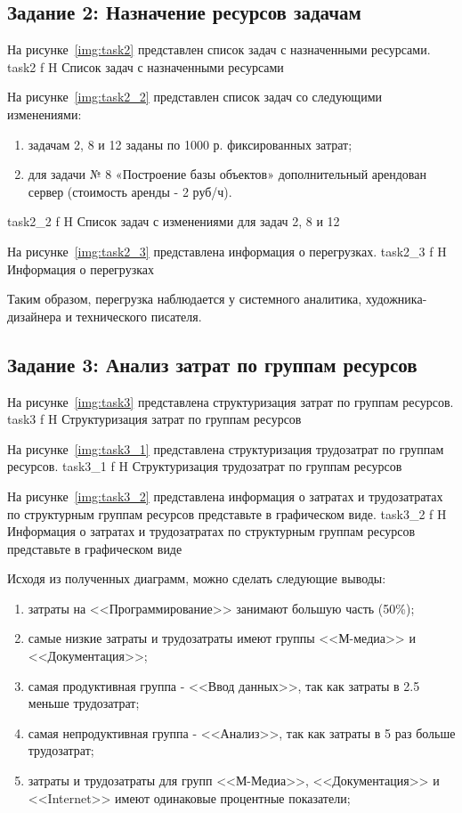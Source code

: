 \subsection{Задание 2: Назначение ресурсов задачам}

На рисунке~\ref{img:task2} представлен список задач с назначенными ресурсами.
	{task2}
	{f}
	{H}
	{\textwidth}
	{Список задач с назначенными ресурсами}

\clearpage
На рисунке~\ref{img:task2_2} представлен список задач со следующими изменениями:
\begin{enumerate}
	\item задачам 2, 8 и 12 заданы по 1000 р. фиксированных затрат;
	\item для задачи № 8 «Построение базы объектов» дополнительный арендован сервер (стоимость аренды - 2 руб/ч).
\end{enumerate}
	{task2_2}
	{f}
	{H}
	{\textwidth}
	{Список задач с изменениями для задач 2, 8 и 12}


На рисунке~\ref{img:task2_3} представлена информация о перегрузках.
	{task2_3}
	{f}
	{H}
	{\textwidth}
	{Информация о перегрузках}

Таким образом, перегрузка наблюдается у системного аналитика, художника-дизайнера и технического писателя.

\subsection{Задание 3: Анализ затрат по группам ресурсов}

На рисунке~\ref{img:task3} представлена структуризация затрат по группам ресурсов.
	{task3}
	{f}
	{H}
	{\textwidth}
	{Структуризация затрат по группам ресурсов}

На рисунке~\ref{img:task3_1} представлена структуризация трудозатрат по группам ресурсов.
	{task3_1}
	{f}
	{H}
	{\textwidth}
	{Структуризация трудозатрат по группам ресурсов}

\clearpage
На рисунке~\ref{img:task3_2} представлена информация о затратах и трудозатратах по структурным группам ресурсов представьте в графическом виде.
	{task3_2}
	{f}
	{H}
	{\textwidth}
	{Информация о затратах и трудозатратах по структурным группам ресурсов представьте в графическом виде}

Исходя из полученных диаграмм, можно сделать следующие выводы:
\begin{enumerate}
	\item затраты на <<Программирование>> занимают большую часть (50\%);
	\item самые низкие затраты и трудозатраты имеют группы <<М-медиа>> и <<Документация>>;
	\item самая продуктивная группа - <<Ввод данных>>, так как затраты в 2.5 меньше трудозатрат;
	\item самая непродуктивная группа - <<Анализ>>, так как затраты в 5 раз больше трудозатрат;
	\item затраты и трудозатраты для групп <<М-Медиа>>, <<Документация>> и <<Internet>> имеют одинаковые процентные показатели;
\end{enumerate}
